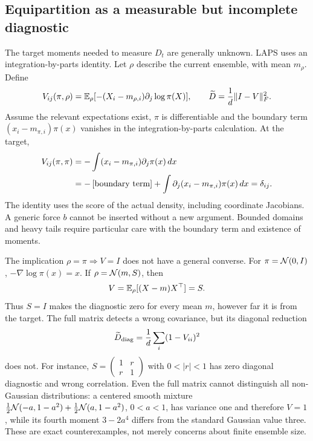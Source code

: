 \subsection{Equipartition as a measurable but incomplete diagnostic}

The target moments needed to measure $D_t$ are generally unknown. LAPS uses
an integration-by-parts identity. Let $\rho$ describe the current ensemble,
with mean $m_\rho$. Define
\begin{equation}
 V_{ij}(\pi,\rho)
 =\mathbb{E}_\rho[-(X_i-m_{\rho,i})\partial_j\log\pi(X)],\qquad
 \widetilde D=\frac1d\|I-V\|_F^2.
 \label{eq:bf-modern-equipartition}
\end{equation}
Assume the relevant expectations exist, $\pi$ is differentiable and the
boundary term $(x_i-m_{\pi,i})\pi(x)$ vanishes in the integration-by-parts
calculation. At the target,
\begin{align}
 V_{ij}(\pi,\pi)
 &=-\int(x_i-m_{\pi,i})\partial_j\pi(x)\,dx\\
 &=-\left[\hbox{boundary term}\right]
      +\int\partial_j(x_i-m_{\pi,i})\pi(x)\,dx
   =\delta_{ij}.
 \label{eq:bf-modern-equipartition-proof}
\end{align}
The identity uses the score of the actual density, including coordinate
Jacobians. A generic force $b$ cannot be inserted without a new argument.
Bounded domains and heavy tails require particular care with the boundary
term and existence of moments.

The implication $\rho=\pi\Rightarrow V=I$ does not have a general converse.
For $\pi=\mathcal{N}(0,I)$, $-\nabla\log\pi(x)=x$. If
$\rho=\mathcal{N}(m,S)$, then
\begin{equation}
 V=\mathbb{E}_\rho[(X-m)X^\top]=S.
 \label{eq:bf-modern-equipartition-gaussian}
\end{equation}
Thus $S=I$ makes the diagnostic zero for every mean $m$, however far it is
from the target. The full matrix detects a wrong covariance, but its
diagonal reduction
\begin{equation}
 \widetilde D_{\rm diag}=\frac1d\sum_i(1-V_{ii})^2
 \label{eq:bf-modern-equipartition-diagonal}
\end{equation}
does not. For instance, $S=\left(\begin{smallmatrix}1&r\\r&1\end{smallmatrix}\right)$
with $0<|r|<1$ has zero diagonal diagnostic and wrong correlation. Even the
full matrix cannot distinguish all non-Gaussian distributions: a centered
smooth mixture
$\tfrac12\mathcal{N}(-a,1-a^2)+\tfrac12\mathcal{N}(a,1-a^2)$, $0<a<1$, has variance
one and therefore $V=1$, while its fourth moment
$3-2a^4$ differs from the standard Gaussian value three. These are exact
counterexamples, not merely concerns about finite ensemble size.

